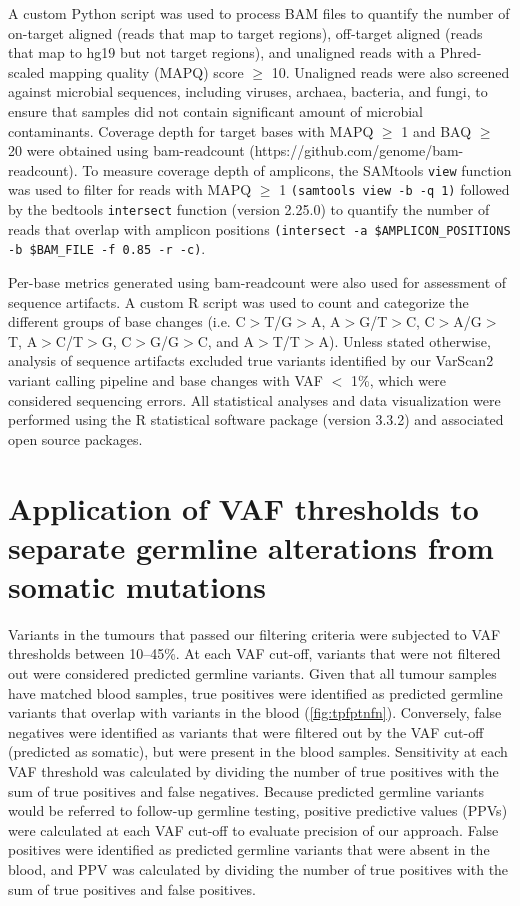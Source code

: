 A custom Python script was used to process BAM files to quantify the number of on-target aligned (reads that map to target regions), off-target aligned (reads that map to hg19 but not target regions), and unaligned reads with a Phred-scaled mapping quality (\acs{MAPQ}) score $\geq$ 10. Unaligned reads were also screened against microbial sequences, including viruses, archaea, bacteria, and fungi, to ensure that samples did not contain significant amount of microbial contaminants. Coverage depth for target bases with MAPQ $\geq$ 1 and BAQ $\geq$ 20 were obtained using bam-readcount (https://github.com/genome/bam-readcount). To measure coverage depth of amplicons, the SAMtools \texttt{view} function was used to filter for reads with MAPQ $\geq$ 1 \texttt{(samtools view -b -q 1)} followed by the bedtools \texttt{intersect} function (version 2.25.0) to quantify the number of reads that overlap with amplicon positions \texttt{(intersect -a \$AMPLICON\_POSITIONS -b \$BAM\_FILE -f 0.85 -r -c)}.

Per-base metrics generated using bam-readcount were also used for assessment of sequence artifacts. A custom R script was used to count and categorize the different groups of base changes (i.e. C$>$T/G$>$A, A$>$G/T$>$C, C$>$A/G$>$T, A$>$C/T$>$G, C$>$G/G$>$C, and A$>$T/T$>$A). Unless stated otherwise, analysis of sequence artifacts excluded true variants identified by our VarScan2 variant calling pipeline and base changes with VAF $<$ 1\%, which were considered sequencing errors. All statistical analyses and data visualization were performed using the R statistical software package (version 3.3.2) and associated open source packages.

\section{Application of VAF thresholds to separate germline alterations from somatic mutations}
\label{sec:ApplicationofVAFthresholdstoseparategermlinealterationsfromsomaticmutations}

Variants in the tumours that passed our filtering criteria were subjected to VAF thresholds between 10--45\%. At each VAF cut-off, variants that were not filtered out were considered predicted germline variants. Given that all tumour samples have matched blood samples, true positives were identified as predicted germline variants that overlap with variants in the blood (\autoref{fig:tpfptnfn}). Conversely, false negatives were identified as variants that were filtered out by the VAF cut-off (predicted as somatic), but were present in the blood samples. Sensitivity at each VAF threshold was calculated by dividing the number of true positives with the sum of true positives and false negatives. Because predicted germline variants would be referred to follow-up germline testing, positive predictive values (\acs{PPV}s) were calculated at each VAF cut-off to evaluate precision of our approach. False positives were identified as predicted germline variants that were absent in the blood, and PPV was calculated by dividing the number of true positives with the sum of true positives and false positives.

